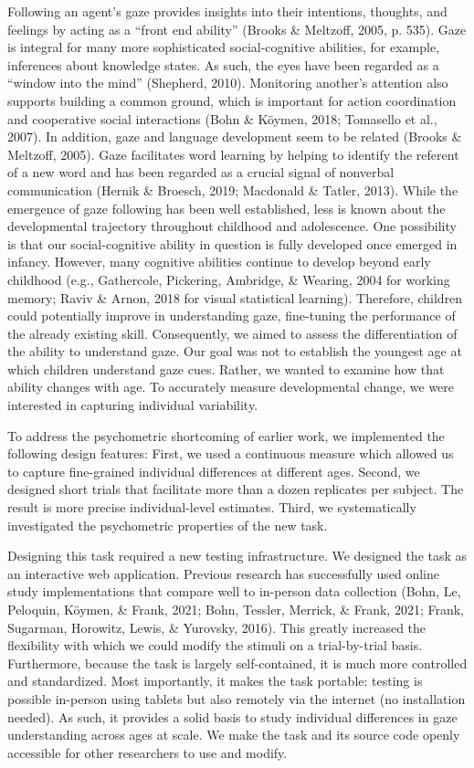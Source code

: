 \documentclass[
  man,floatsintext]{apa7}
\begin{document}
Following an agent's gaze provides insights into their intentions, thoughts, and feelings by acting as a ``front end ability'' (Brooks \& Meltzoff, 2005, p. 535).
Gaze is integral for many more sophisticated social-cognitive abilities, for example, inferences about knowledge states.
As such, the eyes have been regarded as a ``window into the mind'' (Shepherd, 2010).
Monitoring another's attention also supports building a common ground, which is important for action coordination and cooperative social interactions (Bohn \& Köymen, 2018; Tomasello et al., 2007).
In addition, gaze and language development seem to be related (Brooks \& Meltzoff, 2005).
Gaze facilitates word learning by helping to identify the referent of a new word and has been regarded as a crucial signal of nonverbal communication (Hernik \& Broesch, 2019; Macdonald \& Tatler, 2013).
While the emergence of gaze following has been well established, less is known about the developmental trajectory throughout childhood and adolescence.
One possibility is that our social-cognitive ability in question is fully developed once emerged in infancy.
However, many cognitive abilities continue to develop beyond early childhood (e.g., Gathercole, Pickering, Ambridge, \& Wearing, 2004 for working memory; Raviv \& Arnon, 2018 for visual statistical learning).
Therefore, children could potentially improve in understanding gaze, fine-tuning the performance of the already existing skill.
Consequently, we aimed to assess the differentiation of the ability to understand gaze.
Our goal was not to establish the youngest age at which children understand gaze cues.
Rather, we wanted to examine how that ability changes with age.
To accurately measure developmental change, we were interested in capturing individual variability.

To address the psychometric shortcoming of earlier work, we implemented the following design features: First, we used a continuous measure which allowed us to capture fine-grained individual differences at different ages.
Second, we designed short trials that facilitate more than a dozen replicates per subject.
The result is more precise individual-level estimates.
Third, we systematically investigated the psychometric properties of the new task.

Designing this task required a new testing infrastructure.
We designed the task as an interactive web application.
Previous research has successfully used online study implementations that compare well to in-person data collection (Bohn, Le, Peloquin, Köymen, \& Frank, 2021; Bohn, Tessler, Merrick, \& Frank, 2021; Frank, Sugarman, Horowitz, Lewis, \& Yurovsky, 2016).
This greatly increased the flexibility with which we could modify the stimuli on a trial-by-trial basis.
Furthermore, because the task is largely self-contained, it is much more controlled and standardized.
Most importantly, it makes the task portable: testing is possible in-person using tablets but also remotely via the internet (no installation needed).
As such, it provides a solid basis to study individual differences in gaze understanding across ages at scale.
We make the task and its source code openly accessible for other researchers to use and modify.
\end{document}
